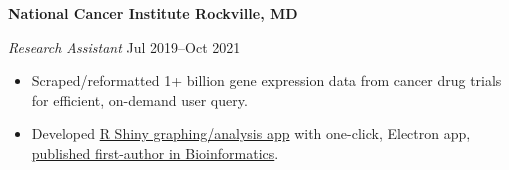 \textbf{National Cancer Institute \hfill Rockville, MD}\par

\textit{Research Assistant} \hfill Jul 2019--Oct 2021 \par
\begin{itemize}
	\item Scraped/reformatted 1+ billion gene expression data from cancer drug trials for efficient, on-demand user query.
	\item Developed \href{https://github.com/petezh/TP-Workbench}{R Shiny graphing/analysis  app} with one-click, Electron app, \href{https://academic.oup.com/bioinformatics/advance-article/doi/10.1093/bioinformatics/btab619/6358719?login=true}{published first-author in Bioinformatics}.
\end{itemize}\par
